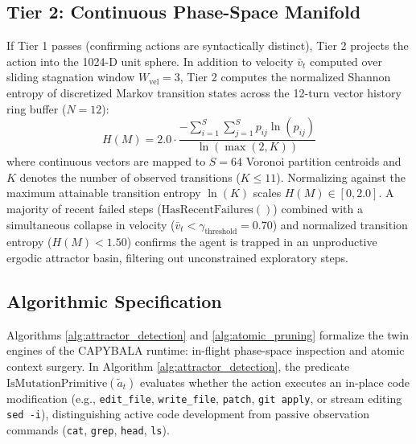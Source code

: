 \documentclass[journal]{IEEEtran}
\begin{document}
\subsection{Tier 2: Continuous Phase-Space Manifold}
If Tier 1 passes (confirming actions are syntactically distinct), Tier 2 projects the action into the 1024-D unit sphere. 
In addition to velocity $\bar{v}_t$ computed over sliding stagnation window $W_{\text{vel}} = 3$, Tier 2 computes the normalized Shannon entropy of discretized Markov transition states across the 12-turn vector history ring buffer ($N = 12$):
\begin{equation}
H(M) = 2.0 \cdot \frac{-\sum_{i=1}^S \sum_{j=1}^S p_{ij} \ln(p_{ij})}{\ln(\max(2, K))}
\end{equation}
where continuous vectors are mapped to $S = 64$ Voronoi partition centroids and $K$ denotes the number of observed transitions ($K \le 11$). Normalizing against the maximum attainable transition entropy $\ln(K)$ scales $H(M) \in [0, 2.0]$. A majority of recent failed steps ($\text{HasRecentFailures}()$) combined with a simultaneous collapse in velocity ($\bar{v}_t < \gamma_{\text{threshold}} = 0.70$) and normalized transition entropy ($H(M) < 1.50$) confirms the agent is trapped in an unproductive ergodic attractor basin, filtering out unconstrained exploratory steps.

\subsection{Algorithmic Specification}
Algorithms \ref{alg:attractor_detection} and \ref{alg:atomic_pruning} formalize the twin engines of the CAPYBALA runtime: in-flight phase-space inspection and atomic context surgery. In Algorithm \ref{alg:attractor_detection}, the predicate $\text{IsMutationPrimitive}(\tilde{a}_t)$ evaluates whether the action executes an in-place code modification (e.g., \texttt{edit\_file}, \texttt{write\_file}, \texttt{patch}, \texttt{git apply}, or stream editing \texttt{sed -i}), distinguishing active code development from passive observation commands (\texttt{cat}, \texttt{grep}, \texttt{head}, \texttt{ls}).
\end{document}
